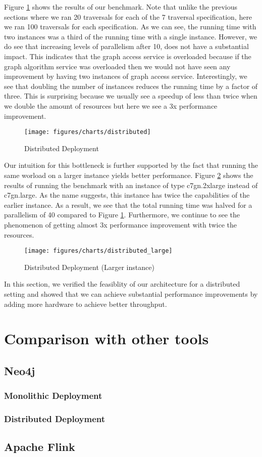 \smallskip
Figure \ref{fig:distributed} shows the results of our benchmark. Note that
unlike the previous sections where we ran 20 traversals for each of the 7
traversal specification, here we ran 100 traversals for each specification.
As we can see, the running time with two instances was a third of the running
time with a single instance. However, we do see that increasing levels of
parallelism after 10, does not have a substantial impact. This indicates that
the graph access service is overloaded because if the graph algorithm service
was overloaded then we would not have seen any improvement by having two
instances of graph access service. Interestingly, we see that doubling the number
of instances reduces the running time by a factor of three. This is surprising
because we usually see a speedup of less than twice when we double the amount of
resources but here we see a 3x performance improvement.
\begin{figure}[ht]
    \centering
    \texttt{[image: figures/charts/distributed]}
    \caption{Distributed Deployment}
    \label{fig:distributed}
\end{figure}


\medskip
Our intuition for this bottleneck is further supported by the fact that running
the same worload on a larger instance yields better performance.
Figure \ref{fig:distributedLarge} shows the results of running the benchmark
with an instance of type c7gn.2xlarge instead of c7gn.large. As the name
suggests, this instance has twice the capabilities of the earlier instance.
As a result, we see that the total running time was halved for a parallelism
of 40 compared to Figure \ref{fig:distributed}. Furthermore, we continue to see
the phenomenon of getting almost 3x performance improvement with twice the
resources.
\begin{figure}[ht]
    \centering
    \texttt{[image: figures/charts/distributed\_large]}
    \caption{Distributed Deployment (Larger instance)}
    \label{fig:distributedLarge}
\end{figure}

\smallskip
In this section, we verified the feasiblity of our architecture for a
distributed setting and showed that we can achieve substantial performance
improvements by adding more hardware to achieve better throughput.

\section{Comparison with other tools}\label{sec:cmpOtherTools}
\subsection{Neo4j}
\subsubsection{Monolithic Deployment}
\subsubsection{Distributed Deployment}
\subsection{Apache Flink}

